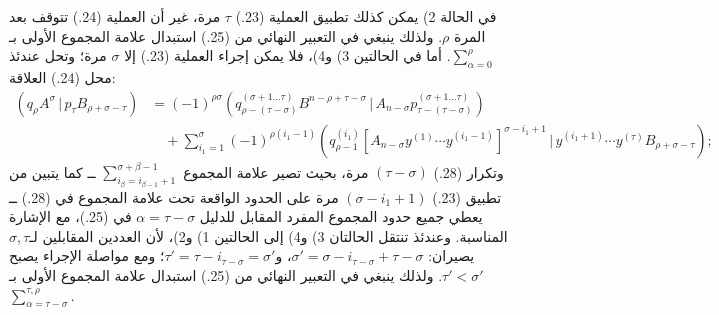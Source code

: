\documentclass[11pt]{article}
\providecommand{\pair}[2]{(#1\,|\,#2)}
\begin{document}
في الحالة 2) يمكن كذلك تطبيق العملية (23.) $\tau$ مرة، غير أن العملية (24.) تتوقف بعد المرة $\rho$. ولذلك ينبغي في التعبير النهائي من (25.) استبدال علامة المجموع الأولى بـ$\sum_{\alpha=0}^{\rho}$. أما في الحالتين 3) و4)، فلا يمكن إجراء العملية (23.) إلا $\sigma$ مرة؛ وتحل عندئذ محل (24.) العلاقة:
\begin{equation}
\begin{aligned}
\pair{q_\rho A^\sigma}{p_\tau B_{\rho+\sigma-\tau}}
&=(-1)^{\rho\sigma}
 \pair{q_{\rho-(\tau-\sigma)}^{(\sigma+1\ldots\tau)}B^{n-\rho+\tau-\sigma}}{A_{n-\sigma}p_{\tau-(\tau-\sigma)}^{(\sigma+1\ldots\tau)}}\\
&\quad+\sum_{i_1=1}^{\sigma}(-1)^{\rho(i_1-1)}
 \pair{q_{\rho-1}^{(i_1)}[A_{n-\sigma}y^{(1)}\cdots y^{(i_1-1)}]^{\sigma-i_1+1}}
 {y^{(i_1+1)}\cdots y^{(\tau)}B_{\rho+\sigma-\tau}};
\end{aligned}
\tag{28}
\end{equation}
وتكرار (28.) $(\tau-\sigma)$ مرة، بحيث تصير علامة المجموع $\sum_{i_\beta=i_{\beta-1}+1}^{\sigma+\beta-1}$ ــ كما يتبين من تطبيق (23.) $(\sigma-i_1+1)$ مرة على الحدود الواقعة تحت علامة المجموع في (28.) ــ يعطي جميع حدود المجموع المفرد المقابل للدليل $\alpha=\tau-\sigma$ في (25.)، مع الإشارة المناسبة. وعندئذ تنتقل الحالتان 3) و4) إلى الحالتين 1) و2)، لأن العددين المقابلين لـ$\sigma,\tau$ يصيران: $\sigma'=\sigma-i_{\tau-\sigma}+\tau-\sigma$، و$\tau'=\tau-i_{\tau-\sigma}=\sigma'$؛ ومع مواصلة الإجراء يصبح $\tau'<\sigma'$. ولذلك ينبغي في التعبير النهائي من (25.) استبدال علامة المجموع الأولى بـ$\sum_{\alpha=\tau-\sigma}^{\tau,\rho}$.
\end{document}
